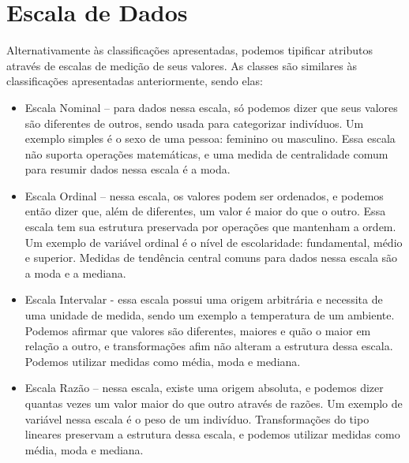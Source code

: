 \section{Escala de Dados}

Alternativamente às classificações apresentadas, podemos tipificar atributos
através de escalas de medição de seus valores. As classes são similares às
classificações apresentadas anteriormente, sendo elas:

\begin{itemize}
\item Escala Nominal -- para dados nessa escala, só podemos dizer que seus
valores são diferentes de outros, sendo usada para categorizar indivíduos.
Um exemplo simples é o sexo de uma pessoa: feminino ou masculino.
Essa escala não suporta operações matemáticas, e uma medida de centralidade
comum para resumir dados nessa escala é a moda.

\item Escala Ordinal -- nessa escala, os valores podem ser ordenados, e podemos
então dizer que, além de diferentes, um valor é maior do que o outro.
Essa escala tem sua estrutura preservada por operações que mantenham a ordem.
Um exemplo de variável ordinal é o nível de escolaridade: fundamental, médio
e superior. Medidas de tendência central comuns para dados nessa escala são a
moda e a mediana.

\item Escala Intervalar - essa escala possui uma origem arbitrária e necessita
de uma unidade de medida, sendo um exemplo a temperatura de um ambiente.
Podemos afirmar que valores são diferentes, maiores e quão o maior em relação
a outro, e transformações afim não alteram a estrutura dessa escala.
Podemos utilizar medidas como média, moda e mediana.

\item Escala Razão -- nessa escala, existe uma origem absoluta, e podemos dizer quantas
vezes um valor maior do que outro através de razões.
Um exemplo de variável nessa escala é o peso de um indivíduo.
Transformações do tipo lineares preservam a estrutura dessa escala, e podemos utilizar
medidas como média, moda e mediana.
\end{itemize}
